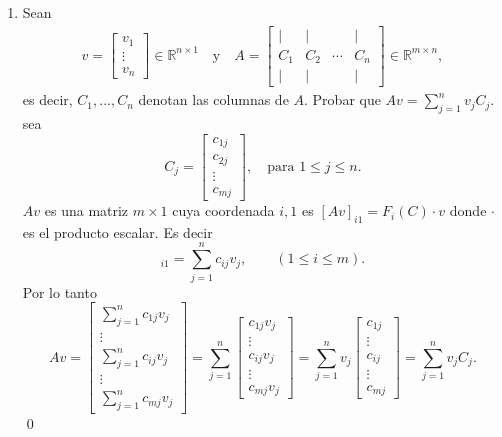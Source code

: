 \begin{enumerate}[topsep=6pt,itemsep=.4cm]
\item\label{ej:multiplicar por columna}  Sean
\begin{align*}
v=\begin{bmatrix} v_1 \\ \vdots \\ v_n
\end{bmatrix}\in\mathbb{R}^{n\times1}
\quad\mbox{y}\quad A=\begin{bmatrix} \mid& \mid& &\mid\\ C_1 & C_2 & \cdots &C_n\\ \mid& \mid& &\mid\end{bmatrix}
\in\mathbb{R}^{m\times n},
\end{align*}
es decir, $C_1, ..., C_n$ denotan las columnas de $A$. Probar que $Av=\sum_{j=1}^nv_jC_j$.
\rta sea 
\begin{equation*}
    C_j = \begin{bmatrix}
        c_{1j} \\c_{2j} \\ \vdots \\ c_{mj} 
    \end{bmatrix}, \quad \text{para $1 \le j \le n$}.
\end{equation*}
$Av$  es una matriz  $m\times 1$ cuya coordenada $i,1$  es $[Av]_{i1} = F_i(C) \cdot v$ donde $\cdot$  es el producto escalar. Es  decir 
\begin{equation*}
    [Av]_{i1} = \sum_{j = 1}^n c_{ij}v_j, \qquad (1 \le i \le m).
\end{equation*}
Por lo tanto
\begin{equation*}
 Av = \begin{bmatrix}
    \sum_{j = 1}^n c_{1j}v_j \\ \vdots \\ \sum_{j = 1}^n c_{ij}v_j \\ \vdots \\ \sum_{j = 1}^n c_{mj}v_j
 \end{bmatrix} =
 \sum_{j = 1}^n
 \begin{bmatrix}
     c_{1j}v_j \\ \vdots \\  c_{ij}v_j \\ \vdots \\ c_{mj}v_j
 \end{bmatrix} =
 \sum_{j = 1}^n v_j
 \begin{bmatrix}
     c_{1j}\\ \vdots \\  c_{ij} \\ \vdots \\ c_{mj}
 \end{bmatrix} =
 \sum_{j = 1}^n v_j C_j.
\end{equation*}
\qed




\end{enumerate}
